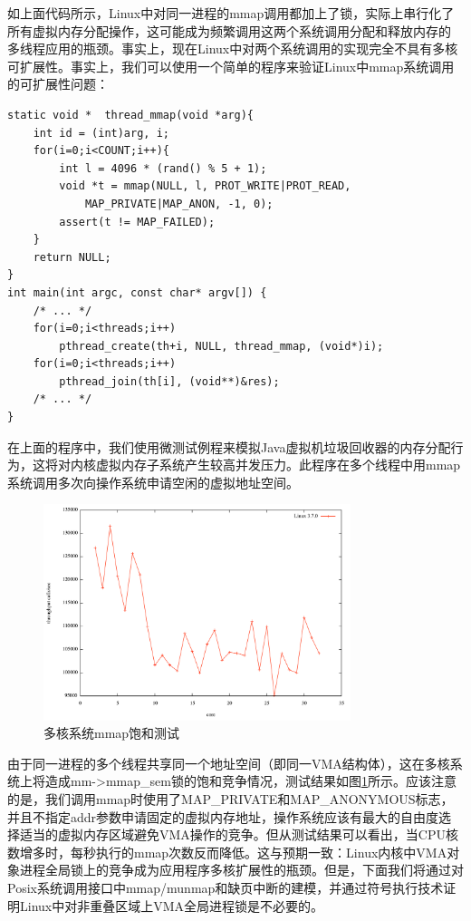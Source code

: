 如上面代码所示，Linux中对同一进程的mmap调用都加上了锁，实际上串行化了所有虚拟内存分配操作，这可能成为频繁调用这两个系统调用分配和释放内存的
多线程应用的瓶颈。事实上，现在Linux中对两个系统调用的实现完全不具有多核可扩展性。事实上，我们可以使用一个简单的程序来验证Linux中mmap系统调用的可扩展性问题：

\begin{lstlisting}
static void *  thread_mmap(void *arg){
	int id = (int)arg, i;
	for(i=0;i<COUNT;i++){
		int l = 4096 * (rand() % 5 + 1);
		void *t = mmap(NULL, l, PROT_WRITE|PROT_READ,
			MAP_PRIVATE|MAP_ANON, -1, 0);
		assert(t != MAP_FAILED);
	}
	return NULL;
}
int main(int argc, const char* argv[]) {
	/* ... */
	for(i=0;i<threads;i++)
		pthread_create(th+i, NULL, thread_mmap, (void*)i);
	for(i=0;i<threads;i++)
		pthread_join(th[i], (void**)&res);
	/* ... */
}
\end{lstlisting}

在上面的程序中，我们使用微测试例程来模拟Java虚拟机垃圾回收器的内存分配行为，这将对内核虚拟内存子系统产生较高并发压力。此程序在多个线程中用mmap系统调用多次向操作系统申请空闲的虚拟地址空间。

\begin{figure}[ht]
\begin{center}
\includegraphics[width=0.8\textwidth]{figures/mmap_test.pdf}
\end{center}
\caption{多核系统mmap饱和测试}
\label{fig:mmap_test}
\end{figure}

由于同一进程的多个线程共享同一个地址空间（即同一VMA结构体），这在多核系统上将造成mm->mmap\_sem锁的饱和竞争情况，测试结果如图\ref{fig:mmap_test}所示。应该注意的是，我们调用mmap时使用了MAP\_PRIVATE和MAP\_ANONYMOUS标志，并且不指定addr参数申请固定的虚拟内存地址，操作系统应该有最大的自由度选择适当的虚拟内存区域避免VMA操作的竞争。但从测试结果可以看出，当CPU核数增多时，每秒执行的mmap次数反而降低。这与预期一致：Linux内核中VMA对象进程全局锁上的竞争成为应用程序多核扩展性的瓶颈。但是，下面我们将通过对Posix系统调用接口中mmap/munmap和缺页中断的建模，并通过符号执行技术证明Linux中对非重叠区域上VMA全局进程锁是不必要的。



